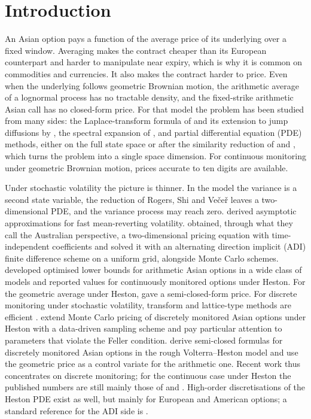 \section{Introduction}\label{sec:intro}

An Asian option pays a function of the average price of its underlying over a fixed window. Averaging
makes the contract cheaper than its European counterpart and harder to manipulate near expiry, which is
why it is common on commodities and currencies. It also makes the contract harder to price. Even when the
underlying follows geometric Brownian motion, the arithmetic average of a lognormal process has no
tractable density, and the fixed-strike arithmetic Asian call has no closed-form price. For that model
the problem has been studied from many sides: the Laplace-transform formula of \citet{GemanYor1993} and
its extension to jump diffusions by \citet{CaiKou2012}, the spectral expansion of \citet{Linetsky2004},
and partial differential equation (PDE) methods, either on the full state space \citep{ZvanForsythVetzal1998}
or after the similarity reduction of \citet{RogersShi1995} and \citet{Vecer2001,Vecer2002}, which turns
the problem into a single space dimension. For continuous monitoring under geometric Brownian motion,
prices accurate to ten digits are available.

Under stochastic volatility the picture is thinner. In the \citet{Heston1993} model the variance is a
second state variable, the reduction of Rogers, Shi and Ve\v{c}e\v{r} leaves a two-dimensional PDE, and
the variance process may reach zero. \citet{FouqueHan2003} derived asymptotic approximations for fast
mean-reverting volatility. \citet{EwaldMenkensTing2013} obtained, through what they call the Australian
perspective, a two-dimensional pricing equation with time-independent coefficients and solved it with an
alternating direction implicit (ADI) finite difference scheme on a uniform grid, alongside Monte Carlo
schemes. \citet{FusaiKyriakou2016} developed optimised lower bounds for arithmetic Asian options in a
wide class of models and reported values for continuously monitored options under Heston. For the
geometric average under Heston, \citet{KimWee2014} gave a semi-closed-form price. For discrete monitoring
under stochastic volatility, transform and lattice-type methods are efficient
\citep{Corsaro2019,KirkbyNguyen2020}. \citet{PerottiGrzelak2024} extend Monte Carlo pricing of discretely
monitored Asian options under Heston with a data-driven sampling scheme and pay particular attention to
parameters that violate the Feller condition. \citet{CustersKarbachFriesen2026} derive semi-closed
formulas for discretely monitored Asian options in the rough Volterra--Heston model and use the geometric
price as a control variate for the arithmetic one. Recent work thus concentrates on discrete monitoring;
for the continuous case under Heston the published numbers are still mainly those of
\citet{EwaldMenkensTing2013} and \citet{FusaiKyriakou2016}. High-order discretisations of the Heston PDE exist as well, but
mainly for European and American options; a standard reference for the ADI side is
\citet{inthoutFoulon2010}.


